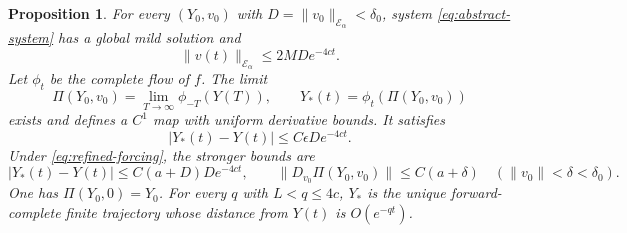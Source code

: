 \documentclass[11pt]{amsart}
\newtheorem{proposition}[theorem]{Proposition}
\theoremstyle{definition}
\theoremstyle{remark}
\begin{document}
\begin{proposition}\label{prop:abstract-phase}
For every $(Y_0,v_0)$ with $D=\|v_0\|_{\mathcal E_\alpha}<\delta_0$,
system \eqref{eq:abstract-system} has a global mild solution and
\begin{equation}\label{eq:normal-decay}
 \|v(t)\|_{\mathcal E_\alpha}\le2MD e^{-4ct}.
\end{equation}
Let $\phi_t$ be the complete flow of $f$. The limit
\begin{equation}\label{eq:phase-limit}
 \Pi(Y_0,v_0)=\lim_{T\to\infty}\phi_{-T}(Y(T)),\qquad
 Y_*(t)=\phi_t(\Pi(Y_0,v_0))
\end{equation}
exists and defines a $C^1$ map with uniform derivative bounds.
It satisfies
\begin{equation}\label{eq:phase-estimate}
 |Y_*(t)-Y(t)|\le C\epsilon D e^{-4ct}.
\end{equation}
Under \eqref{eq:refined-forcing}, the stronger bounds are
\begin{equation}\label{eq:phase-refined}
 |Y_*(t)-Y(t)|\le C(a+D)D e^{-4ct},\qquad
 \|D_{v_0}\Pi(Y_0,v_0)\|\le C(a+\delta)
 \quad(\|v_0\|<\delta<\delta_0).
\end{equation}
One has $\Pi(Y_0,0)=Y_0$. For every $q$ with $L<q\le4c$,
$Y_*$ is the unique forward-complete finite trajectory whose
distance from $Y(t)$ is $O(e^{-qt})$.
\end{proposition}
\end{document}
